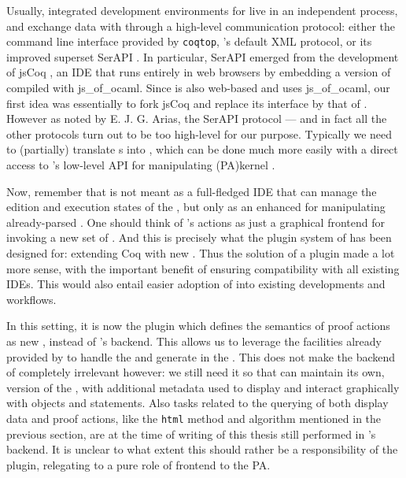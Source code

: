 Usually, integrated development environments for  live in an independent
process, and exchange data with  through a high-level communication protocol:
either the command line interface provided by \texttt{coqtop}, 's default XML
protocol, or its improved superset SerAPI .
In particular, SerAPI emerged from the development of jsCoq
, an IDE that runs entirely in web browsers by
embedding a version of  compiled with js\_of\_ocaml. Since  is also
web-based and uses js\_of\_ocaml, our first idea was essentially to fork jsCoq
and replace its interface by that of . However as noted by E. J. G. Arias,
the SerAPI protocol --- and in fact all the other protocols turn out to be too
high-level for our purpose. Typically we need to (partially) translate  s
into  , which can be done much more easily with a direct access to
's low-level API for manipulating \kl(PA){kernel} .

Now, remember that  is not meant as a full-fledged IDE that can manage the
edition and execution states of the , but only as an enhanced  for manipulating already-parsed . One should think of 's actions
as just a graphical frontend for invoking a new set of . And this is
precisely what the plugin system of  has been designed for: extending Coq
with new . Thus the solution of a  plugin made a lot more sense, with
the important benefit of ensuring compatibility with all existing IDEs. This
would also entail easier adoption of  into existing  developments and
workflows.

In this setting, it is now the  plugin which defines the semantics of proof
actions as new , instead of 's backend. This allows us to leverage
the facilities already provided by  to handle the  and generate
 in the . This does not
make the backend of  completely irrelevant however: we still need it so
that  can maintain its own,  version of the ,
with additional metadata used to display and interact graphically with objects
and statements. Also tasks related to the querying of both display data and
proof actions, like the \texttt{html} method and  algorithm mentioned
in the previous section, are at the time of writing of this thesis still
performed in 's backend. It is unclear to what extent this should rather
be a responsibility of the  plugin, relegating  to a pure role of
frontend to the PA.

